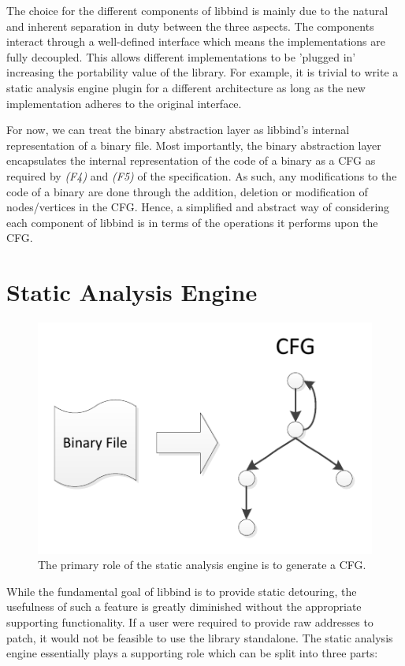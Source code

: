 The choice for the different components of libbind is mainly due to the natural and inherent separation in duty between the three aspects. The components interact through a well-defined interface which means the implementations are fully decoupled. This allows different implementations to be 'plugged in' increasing the portability value of the library. For example, it is trivial to write a static analysis engine plugin for a different architecture as long as the new implementation adheres to the original interface.

For now, we can treat the binary abstraction layer as libbind's internal representation of a binary file. Most importantly, the binary abstraction layer encapsulates the internal representation of the code of a binary as a CFG as required by \emph{(F4)} and \emph{(F5)} of the specification. As such, any modifications to the code of a binary are done through the addition, deletion or modification of nodes/vertices in the CFG. Hence, a simplified and abstract way of considering each component of libbind is in terms of the operations it performs upon the CFG.

\section{Static Analysis Engine}

\begin{figure}[H]
 \centering
 \includegraphics{Static_Analysis_Engine.pdf}
 \caption[Static Analysis Engine]{The primary role of the static analysis engine is to generate a CFG.}
\end{figure}

While the fundamental goal of libbind is to provide static detouring, the usefulness of such a feature is greatly diminished without the appropriate supporting functionality. If a user were required to provide raw addresses to patch, it would not be feasible to use the library standalone. The static analysis engine essentially plays a supporting role which can be split into three parts:

